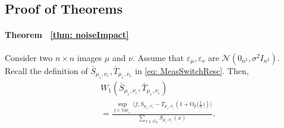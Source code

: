 \documentclass{article}
\theoremstyle{plain}
\theoremstyle{definition}
\theoremstyle{remark}
\providecommand{\Oh}{\mathrm{O}}
\begin{document}
\subsection{Proof of Theorems}
\label{sec: ProofThms}
\paragraph{Theorem ~\ref{thm: noiseImpact}}
Consider two $n \times n$ images $\mu$ and $\nu$.
  Assume that $\varepsilon_\mu,\varepsilon_\nu$ are $\mathcal{N}(0_{n^2}, \sigma^2I_{n^2})$. Recall the definition of $\bar S_{\mu_\varepsilon, \nu_\varepsilon}, \bar T_{\mu_\varepsilon, \nu_\varepsilon}$ in \eqref{eq: MeasSwitchResc}. Then, 
\begin{align}
    & W_1
    (
        \bar S_{\mu_\varepsilon, \nu_\varepsilon}
        ,
        \bar T_{\mu_\varepsilon, \nu_\varepsilon}
    )
    \\
    &=
    \frac
    {
        \sup_{f \in \operatorname{Lip}_1}
        \big\langle
            f
            ,
            S_{\mu_\varepsilon, \nu_\varepsilon}
            -
            T_{\mu_\varepsilon, \nu_\varepsilon}
            \left(
                1
                +
                \Oh_p
                \big(
                    \tfrac{1}{n}
                \big)
            \right)
        \big\rangle
    }
    {
        \sum_{x\in G_n}
        S_{\mu_\varepsilon, \nu_\varepsilon}(x)
    }. \nonumber
\end{align}
\end{document}
